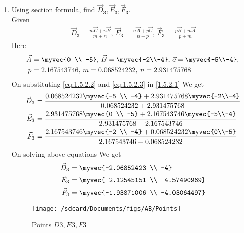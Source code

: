 \documentclass[11pt]{book}
\begin{document}
\begin{enumerate}[label=\thesection.\arabic*.,ref=\thesection.\theenumi]
\item Using section formula, find $\vec{D}_3, \vec{E}_3, \vec{F}_3$. \\
\solution Given
\begin{align}
			\vec{D}_3 = \frac{m\vec{C}+n\vec{B}}{m+n},\,
			\vec{E}_3 = \frac{n\vec{A}+p\vec{C}}{n+p},\,
			\vec{F}_3 = \frac{p\vec{B}+m\vec{A}}{p+m} \label{eq:1.5.2.1}
\end{align}
Here
\begin{align}
	\vec{A} &= \myvec{0 \\ -5},\,
	\vec{B} = \myvec{-2\\-4},\,
	\vec{c} = \myvec{-5\\-4},\, \label{eq:1.5.2.2} \\
	p &= 2.167543746,\,
	m = 0.068524232,\,
	n = 2.931475768  \label{eq:1.5.2.3}
\end{align}
On substituting \eqref{eq:1.5.2.2} and \eqref{eq:1.5.2.3} in \eqref{1.5.2.1} We get
\begin{align}
    \vec{D}_3 &= \frac{0.068524232\myvec{-5 \\ -4} + 2.931475768\myvec{-2\\-4}}{0.068524232+2.931475768} \\
    \vec{E}_3 &= \frac{2.931475768\myvec{0 \\ -5} + 2.167543746\myvec{-5\\-4}}{2.931475768+2.167543746} \\
    \vec{F}_3 &= \frac{2.167543746\myvec{-2 \\ -4} + 0.068524232\myvec{0\\-5}}{2.167543746+0.068524232}
\end{align}
On solving above equations We get 
\begin{align}
    \vec{D}_3 &= \myvec{-2.06852423  \\ -4} \\
    \vec{E}_3 &= \myvec{-2.12545151  \\ -4.57490969} \\
    \vec{F}_3 &= \myvec{-1.93871006  \\ -4.03064497} 
\end{align}
\begin{figure}[H]
\texttt{[image: /sdcard/Documents/figs/AB/Points]}
\caption{Points $D3,E3,F3$}
\label{fig:fig1}
\end{figure}


\end{enumerate}
\end{document}

